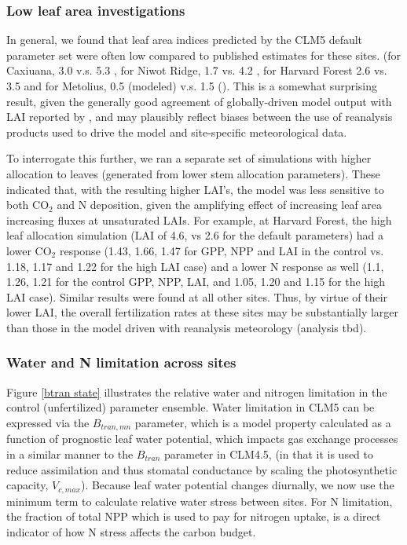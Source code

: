 \documentclass[draft,linenumbers]{agujournal}
\begin{document}
\subsubsection{Low leaf area investigations}
In general, we found that leaf area indices predicted by the CLM5 default parameter set were often low  compared to published estimates for these sites. (for Caxiuana, 3.0 v.s. 5.3 \cite{fisher2007}, for Niwot Ridge, 1.7 vs. 4.2 \cite{bowling2009}, for Harvard Forest 2.6 vs. 3.5 \cite{williams1996} and for Metolius, 0.5 (modeled) v.s. 1.5 (\cite{spadavecchia2011}). This is a somewhat surprising result, given the generally good agreement of globally-driven model output with LAI reported by \cite{lawrence2018}, and may plausibly reflect biases between the use of reanalysis products used to drive the model and site-specific meteorological data. 

To interrogate this further, we ran a separate set of simulations with higher allocation to leaves (generated from lower stem allocation parameters). These indicated that, with the resulting higher LAI's, the model was less sensitive to both CO$_{2}$ and N deposition, given the amplifying effect of increasing leaf area increasing fluxes at unsaturated LAIs.   For example, at Harvard Forest, the high leaf allocation  simulation (LAI of 4.6, vs 2.6 for the default parameters) had a lower CO$_{2}$ response (1.43, 1.66, 1.47 for GPP, NPP and LAI in the control vs. 1.18, 1.17 and 1.22 for the high LAI case) and a lower N response as well (1.1, 1.26, 1.21 for the control GPP, NPP, LAI, and 1.05, 1.20 and 1.15 for the high LAI case). Similar results were found at all other sites.  Thus, by virtue of their lower LAI, the overall fertilization rates at these sites may be substantially larger than those in the model driven with reanalysis meteorology (analysis tbd). 

\subsubsection{Water and N limitation across sites}
Figure \ref{btran state} illustrates the relative water and nitrogen limitation in the control (unfertilized) parameter ensemble. Water limitation in CLM5 can be expressed via the $B_{tran,mn}$ parameter, which is a model property calculated as a function of prognostic leaf water potential, which impacts gas exchange processes in a similar manner to the $B_{tran}$ parameter in CLM4.5, (in that it is used to reduce assimilation and thus stomatal conductance by scaling the photosynthetic capacity, $V_{c,max}$). Because leaf water potential changes diurnally, we now use the minimum term to calculate relative water stress between sites. For N limitation, the fraction of total NPP which is used to pay for nitrogen uptake, is a direct indicator of how N stress affects the carbon budget.  
\end{document}
